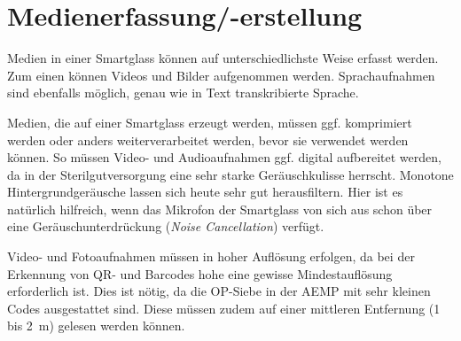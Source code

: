 \section{Medienerfassung/-erstellung}
\label{sec:Medienerfassung_-erstellung}
Medien in einer Smartglass können auf unterschiedlichste Weise erfasst werden. Zum einen können Videos und Bilder aufgenommen werden. Sprachaufnahmen sind ebenfalls möglich, genau wie in Text transkribierte Sprache.

Medien, die auf einer Smartglass erzeugt werden, müssen ggf. komprimiert werden oder anders weiterverarbeitet werden, bevor sie verwendet werden können. So müssen Video- und Audioaufnahmen ggf. digital aufbereitet werden, da in der Sterilgutversorgung eine sehr starke Geräuschkulisse herrscht. Monotone Hintergrundgeräusche lassen sich heute sehr gut herausfiltern. Hier ist es natürlich hilfreich, wenn das Mikrofon der Smartglass von sich aus schon über eine Geräuschunterdrückung (\emph{Noise Cancellation}) verfügt.

Video- und Fotoaufnahmen müssen in hoher Auflösung erfolgen, da bei der Erkennung von QR- und Barcodes hohe eine gewisse Mindestauflösung erforderlich ist. Dies ist nötig, da die OP-Siebe in der AEMP mit sehr kleinen Codes ausgestattet sind. Diese müssen zudem auf einer mittleren Entfernung (1 bis 2~m) gelesen werden können.